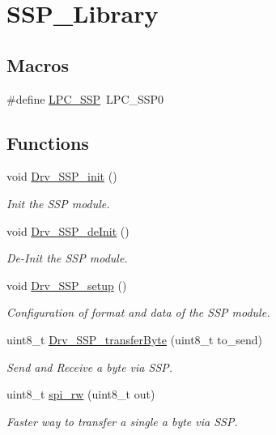 \hypertarget{group___s_s_p___library}{}\section{S\+S\+P\+\_\+\+Library}
\label{group___s_s_p___library}
\subsection*{Macros}
\begin{DoxyCompactItemize}
\item 
\#define \hyperlink{group___s_s_p___library_ga3e1177fbcbb4d87f0a2391e59042a5fc}{L\+P\+C\+\_\+\+S\+S\+P}~L\+P\+C\+\_\+\+S\+S\+P0
\end{DoxyCompactItemize}
\subsection*{Functions}
\begin{DoxyCompactItemize}
\item 
void \hyperlink{group___s_s_p___library_ga0c5eb23f106efe0d4b8687874954c549}{Drv\+\_\+\+S\+S\+P\+\_\+init} ()
\begin{DoxyCompactList}\small\item\em Init the S\+S\+P module. \end{DoxyCompactList}\item 
void \hyperlink{group___s_s_p___library_ga564dfbd00e01e9e2f7e5cb1537b46db6}{Drv\+\_\+\+S\+S\+P\+\_\+de\+Init} ()
\begin{DoxyCompactList}\small\item\em De-\/\+Init the S\+S\+P module. \end{DoxyCompactList}\item 
void \hyperlink{group___s_s_p___library_ga0f01059c0a84ecf456f3ad9d38b9794b}{Drv\+\_\+\+S\+S\+P\+\_\+setup} ()
\begin{DoxyCompactList}\small\item\em Configuration of format and data of the S\+S\+P module. \end{DoxyCompactList}\item 
uint8\+\_\+t \hyperlink{group___s_s_p___library_ga785ce7239c2c42f4a871322b9cff56b7}{Drv\+\_\+\+S\+S\+P\+\_\+transfer\+Byte} (uint8\+\_\+t to\+\_\+send)
\begin{DoxyCompactList}\small\item\em Send and Receive a byte via S\+S\+P. \end{DoxyCompactList}\item 
uint8\+\_\+t \hyperlink{group___s_s_p___library_ga3808c285915bc0c410f4188eafce502d}{spi\+\_\+rw} (uint8\+\_\+t out)
\begin{DoxyCompactList}\small\item\em Faster way to transfer a single a byte via S\+S\+P. \end{DoxyCompactList}\end{DoxyCompactItemize}


